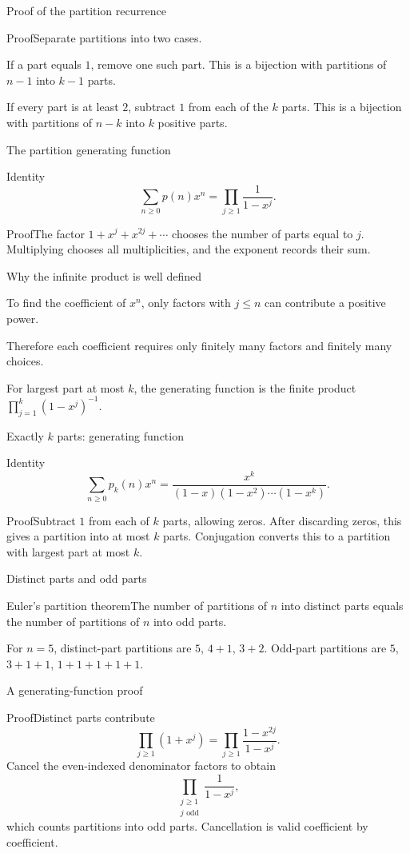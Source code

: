 \documentclass[aspectratio=169,11pt]{beamer}
\newcommand{\Thm}[2]{\begin{block}{#1}#2\end{block}}
\renewcommand{\Proof}[1]{\begin{block}{Proof}\normalsize #1\end{block}}
\newcommand{\gap}{\par\medskip}
\begin{document}
\begin{frame}{Proof of the partition recurrence}
\large
\Proof{Separate partitions into two cases.\gap If a part equals $1$, remove one such part. This is a bijection with partitions of $n-1$ into $k-1$ parts.\gap If every part is at least $2$, subtract $1$ from each of the $k$ parts. This is a bijection with partitions of $n-k$ into $k$ positive parts.}
\end{frame}
\begin{frame}{The partition generating function}
\large
\Thm{Identity}{\[\sum_{n\geq0}p(n)x^n=\prod_{j\geq1}\frac1{1-x^j}.\]}
\Proof{The factor $1+x^j+x^{2j}+\cdots$ chooses the number of parts equal to $j$. Multiplying chooses all multiplicities, and the exponent records their sum.}
\end{frame}
\begin{frame}{Why the infinite product is well defined}
\large
\gap To find the coefficient of $x^n$, only factors with $j\leq n$ can contribute a positive power.
\gap Therefore each coefficient requires only finitely many factors and finitely many choices.
\gap For largest part at most $k$, the generating function is the finite product $\prod_{j=1}^k(1-x^j)^{-1}$.
\end{frame}
\begin{frame}{Exactly $k$ parts: generating function}
\large
\Thm{Identity}{\[\sum_{n\geq0}p_k(n)x^n=\frac{x^k}{(1-x)(1-x^2)\cdots(1-x^k)}.\]}
\Proof{Subtract $1$ from each of $k$ parts, allowing zeros. After discarding zeros, this gives a partition into at most $k$ parts. Conjugation converts this to a partition with largest part at most $k$.}
\end{frame}
\begin{frame}{Distinct parts and odd parts}
\large
\Thm{Euler's partition theorem}{The number of partitions of $n$ into distinct parts equals the number of partitions of $n$ into odd parts.}
\gap For $n=5$, distinct-part partitions are $5$, $4+1$, $3+2$. Odd-part partitions are $5$, $3+1+1$, $1+1+1+1+1$.
\end{frame}
\begin{frame}{A generating-function proof}
\large
\Proof{Distinct parts contribute
\[\prod_{j\geq1}(1+x^j)=\prod_{j\geq1}\frac{1-x^{2j}}{1-x^j}.
\]
Cancel the even-indexed denominator factors to obtain
\[\prod_{\substack{j\geq1\\j\text{ odd}}}\frac1{1-x^j},\]
which counts partitions into odd parts. Cancellation is valid coefficient by coefficient.}
\end{frame}
\end{document}
